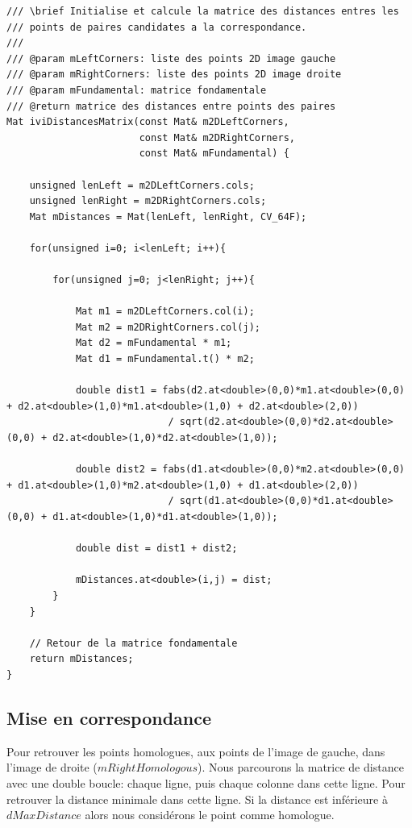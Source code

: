 \documentclass[a4paper,11pt]{article}
\begin{document}
\begin{lstlisting}[caption=Fontion de calcul des distances]
/// \brief Initialise et calcule la matrice des distances entres les
/// points de paires candidates a la correspondance.
///
/// @param mLeftCorners: liste des points 2D image gauche
/// @param mRightCorners: liste des points 2D image droite
/// @param mFundamental: matrice fondamentale
/// @return matrice des distances entre points des paires
Mat iviDistancesMatrix(const Mat& m2DLeftCorners,
                       const Mat& m2DRightCorners,
                       const Mat& mFundamental) {

    unsigned lenLeft = m2DLeftCorners.cols;
    unsigned lenRight = m2DRightCorners.cols;
    Mat mDistances = Mat(lenLeft, lenRight, CV_64F);

    for(unsigned i=0; i<lenLeft; i++){

        for(unsigned j=0; j<lenRight; j++){

            Mat m1 = m2DLeftCorners.col(i);
            Mat m2 = m2DRightCorners.col(j);
            Mat d2 = mFundamental * m1;
            Mat d1 = mFundamental.t() * m2;

            double dist1 = fabs(d2.at<double>(0,0)*m1.at<double>(0,0) + d2.at<double>(1,0)*m1.at<double>(1,0) + d2.at<double>(2,0))
                            / sqrt(d2.at<double>(0,0)*d2.at<double>(0,0) + d2.at<double>(1,0)*d2.at<double>(1,0));

            double dist2 = fabs(d1.at<double>(0,0)*m2.at<double>(0,0) + d1.at<double>(1,0)*m2.at<double>(1,0) + d1.at<double>(2,0))
                            / sqrt(d1.at<double>(0,0)*d1.at<double>(0,0) + d1.at<double>(1,0)*d1.at<double>(1,0));

            double dist = dist1 + dist2;

            mDistances.at<double>(i,j) = dist;
        }
    }

    // Retour de la matrice fondamentale
    return mDistances;
}
\end{lstlisting}

\subsection{Mise en correspondance}

Pour retrouver les points homologues, aux points de l'image de gauche, dans 
l'image de droite ($mRightHomologous$). Nous parcourons la matrice de distance avec une 
double boucle: chaque ligne, puis chaque colonne dans cette ligne. Pour retrouver la 
distance minimale dans cette ligne. Si la distance est inférieure à $dMaxDistance$ 
alors nous considérons le point comme homologue.\\
\end{document}
